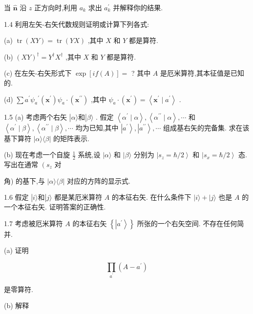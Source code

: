 \documentclass[lang=cn,newtx,10pt,scheme=chinese,thmcnt=section]{elegantbook}
\begin{document}
当 $\widehat{\mathbf{n}}$ 沿 $z$ 正方向时,利用 ${a}_{k}$ 求出 ${a}_{k}^{\prime }$ 并解释你的结果.

1.4 利用左矢-右矢代数规则证明或计算下列各式:

(a) $\operatorname{tr}\left( {XY}\right) = \operatorname{tr}\left( {YX}\right)$ ,其中 $X$ 和 $Y$ 都是算符.

(b) ${\left( XY\right) }^{ \dagger } = {Y}^{ \dagger }{X}^{ \dagger }$ ,其中 $X$ 和 $Y$ 都是算符.

(c) 在左矢-右矢形式下 $\exp \left\lbrack {{if}\left( A\right) }\right\rbrack =$ ? 其中 $A$ 是厄米算符,其本征值是已知的.

(d) $\sum {a}^{\prime }{\psi }_{a}{}^{\prime }\left( {\mathbf{x}}^{\prime }\right) {\psi }_{a} \cdot \left( {\mathbf{x}}^{\prime \prime }\right)$ ,其中 ${\psi }_{a} \cdot \left( {\mathbf{x}}^{\prime }\right) = \left\langle {{\mathbf{x}}^{\prime } \mid {a}^{\prime }}\right\rangle$ .

1.5 (a) 考虑两个右矢 $\left| {\alpha \rangle \text{和}}\right| \beta \rangle$ . 假定 $\left\langle {{\alpha }^{\prime } \mid \alpha }\right\rangle ,\left\langle {{\alpha }^{\prime \prime } \mid \alpha }\right\rangle ,\cdots$ 和 $\left\langle {{\alpha }^{\prime } \mid \beta }\right\rangle ,\left\langle {{\alpha }^{\prime \prime } \mid \beta }\right\rangle ,\cdots$ 均为已知,其中 $\left| {a}^{\prime }\right\rangle ,\left| {a}^{\prime \prime }\right\rangle ,\cdots$ 组成基右矢的完备集. 求在该基下算符 $|\alpha \rangle \langle \beta |$ 的矩阵表示.

(b) 现在考虑一个自旋 $\frac{1}{2}$ 系统,设 $|\alpha \rangle$ 和 $|\beta \rangle$ 分别为 $\left| {{s}_{z} = \hbar /2}\right\rangle$ 和 $\left| {{s}_{x} = \hbar /2}\right\rangle$ 态. 写出在通常 $\left( {s}_{z}\right.$ 对

角) 的基下,与 $\left| {\alpha \rangle \langle \beta }\right|$ 对应的方阵的显示式.

1.6 假定 $\left| {i\rangle \text{和}}\right| j\rangle$ 都是某厄米算符 $A$ 的本征右矢. 在什么条件下 $\left| {i\rangle + }\right| j\rangle$ 也是 $A$ 的一个本征右矢. 证明答案的正确性.

1.7 考虑被厄米算符 $A$ 的本征右矢 $\left\{ \left| {a}^{\prime }\right\rangle \right\}$ 所张的一个右矢空间. 不存在任何简并.

(a) 证明

$$
\mathop{\prod }\limits_{{a}^{\prime }}\left( {A - {a}^{\prime }}\right)
$$

是零算符.

(b) 解释
\end{document}
